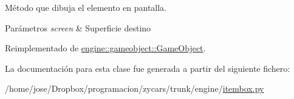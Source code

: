 \-Método que dibuja el elemento en pantalla. 


\begin{DoxyParams}{\-Parámetros}
{\em screen} & \-Superficie destino \\
\hline
\end{DoxyParams}


\-Reimplementado de \hyperlink{classengine_1_1gameobject_1_1GameObject_a576c76eafa707e0d3ac394036e16f2e3}{engine\-::gameobject\-::\-Game\-Object}.



\-La documentación para esta clase fue generada a partir del siguiente fichero\-:\begin{DoxyCompactItemize}
\item 
/home/jose/\-Dropbox/programacion/zycars/trunk/engine/\hyperlink{itembox_8py}{itembox.\-py}\end{DoxyCompactItemize}
